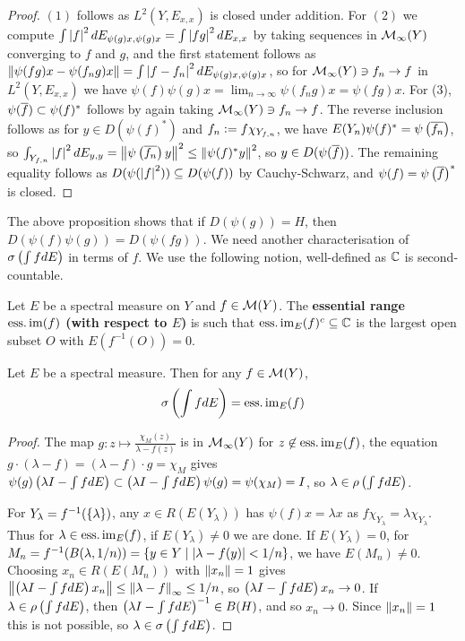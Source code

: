 \documentclass[10pt]{amsart}
\begin{document}
\begin{proof}
    $(1)$ follows as $L^2(Y, E_{x, x})$ is closed under addition. For $(2)$ we compute $\int\left| f \right|^2 dE_{\psi(g)x, \psi(g)x} = \int\left| fg \right|^2 dE_{x, x}$ by taking sequences in $\mathcal{M}_\infty(Y)$ converging to $f$ and $g$, and the first statement follows as $\left\| \psi(fg)x - \psi(f_ng)x \right\| = \int\left| f - f_n \right|^2dE_{\psi(g)x, \psi(g)x}$, so for $\mathcal{M}_\infty(Y) \ni f_n \to f$ in $L^2(Y, E_{x, x})$ we have $\psi(f)\psi(g)x = \lim_{n \to \infty}\psi(f_n g)x = \psi(fg)x$. For (3), $\psi(\overline{f}) \subset \psi(f)^*$ follows by again taking $\mathcal{M}_\infty(Y) \ni f_n \to f$. The reverse inclusion follows as for $y \in D(\psi(f)^*)$ and $f_n \vcentcolon= f\chi_{Y_{f, n}}$, we have $E(Y_n)\psi(f)^* = \psi\left(  \overline{f_n}  \right)$, so $\int_{Y_{f, n}}\left| f \right|^2 dE_{y, y} = \left\| \psi\left(  \overline{f_n}  \right)y \right\|^2 \leq \left\| \psi(f)^*y \right\|^2$, so $y \in D(\psi(\overline{f}))$. The remaining equality follows as $D(\psi(\left| f \right|^2)) \subseteq D(\psi(f))$ by Cauchy-Schwarz, and $\psi(f) = \psi\left(  \overline{f}  \right)^*$ is closed.
\end{proof}
The above proposition shows that if $D(\psi(g)) = H$, then $D(\psi(f)\psi(g)) = D(\psi(fg))$. We need another characterisation of $\sigma\left(  \int f dE  \right)$ in terms of $f$. We use the following notion, well-defined as $\mathbb{C}$ is second-countable.
\begin{definition}
    Let $E$ be a spectral measure on $Y$ and $f \in \mathcal{M}(Y)$. The \textbf{essential range $\operatorname{ess.im}(f)$ (with respect to $E$)} is such that $\operatorname{ess.im}_E(f)^c \subseteq \mathbb{C}$ is the largest open subset $O$ with $E(f^{-1}(O)) = 0$.
\end{definition} %
\begin{proposition}\label{essimspec} %
    Let $E$ be a spectral measure. Then for any $f \in \mathcal{M}(Y)$,
    $$
        \sigma\left(  \int f dE  \right) = \operatorname{ess.im}_E(f)
    $$
\end{proposition}
\begin{proof}
    The map $g : z \mapsto \frac{\chi_M(z)}{\lambda - f(z)}$ is in $\mathcal{M}_\infty(Y)$ for $z \not\in \operatorname{ess.im}_E(f)$, the equation $g \cdot (\lambda - f) = (\lambda - f) \cdot g = \chi_M$ gives $\psi(g)\left(  \lambda I - \int f dE  \right) \subset \left(  \lambda I - \int f dE  \right)\psi(g) = \psi(\chi_M) = I$, so $\lambda \in \rho\left(  \int f dE  \right)$. 
    
    For $Y_\lambda = f^{-1}(\left\{  \lambda  \right\})$, any $x \in R(E(Y_\lambda))$ has $\psi(f)x = \lambda x$ as $f\chi_{Y_\lambda} = \lambda\chi_{Y_\lambda}$. Thus for $\lambda \in \operatorname{ess.im}_E(f)$, if $E(Y_\lambda) \neq 0$ we are done. If $E(Y_\lambda) = 0$, for $M_n = f^{-1}(B(\lambda, 1/n)) = \left\{  y \in Y \mid \left| \lambda - f(y) \right| < 1/n  \right\}$, we have $E(M_n) \neq 0$. Choosing $x_n \in R(E(M_n))$ with $\left\| x_n \right\| = 1$ gives $\left\| \left(  \lambda I - \int f dE  \right) x_n \right\| \leq \left\| \lambda - f \right\|_\infty \leq 1/n$, so $\left(  \lambda I - \int f dE  \right)x_n \to 0$. If $\lambda \in \rho\left(  \int f dE  \right)$, then $\left(  \lambda I - \int f dE  \right)^{-1} \in B(H)$, and so $x_n \to 0$. Since $\left\| x_n \right\| = 1$ this is not possible, so $\lambda \in \sigma\left(  \int f dE  \right)$.
\end{proof}
\end{document}
